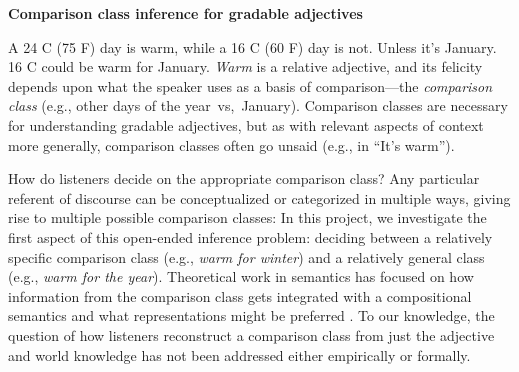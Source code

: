 \documentclass[letterpaper, 12pt]{article}
\begin{document}
\begin{center}
\textbf{Comparison class inference for gradable adjectives}
\end{center}

A 24 \degree C  (75 \degree F) day is warm, while a 16 \degree C  (60 \degree F) day is not. Unless it's January. 16 \degree C  could be warm for January.
\emph{Warm} is a relative adjective, and its felicity depends upon what the speaker uses as a basis of comparison---the \emph{comparison class} (e.g., other days of the year~vs,~January).
Comparison classes are necessary for understanding gradable adjectives, but as with relevant aspects of context more generally, comparison classes often go unsaid (e.g., in ``It's warm'').


How do listeners decide on the appropriate comparison class? 
Any particular referent of discourse can be conceptualized or categorized in multiple ways, giving rise to multiple possible comparison classes: 
In this project, we investigate the first aspect of this open-ended inference problem: deciding between a relatively specific comparison class (e.g., \emph{warm for winter}) and a relatively general class (e.g., \emph{warm for the year}).
Theoretical work in semantics has focused on how information from the comparison class gets integrated with a compositional semantics and what representations might be preferred \cite{Bale2011, Solt2009}. 
To our knowledge, the question of how listeners reconstruct a comparison class from just the adjective and world knowledge has not been addressed either empirically or  formally.
\end{document}
